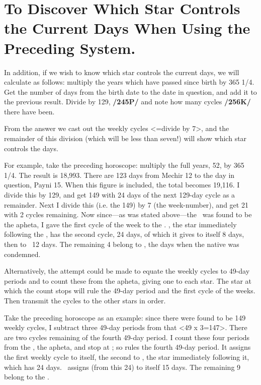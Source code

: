 \section{To Discover Which Star Controls the Current Days When Using the Preceding System.}

In addition, if we wish to know which star controls the current days, we will calculate as follows: multiply the years which have passed since birth by 365 1/4. Get the number of days from the birth date to
the date in question, and add it to the previous result. Divide by 129, \textbf{/245P/} and note how many cycles \textbf{/256K/} there have been. 

From the answer we cast out the weekly cycles <=divide by 7>, and the remainder of this division (which will be less than seven!) will show which star controls the days.

For example, take the preceding horoscope: multiply the full years, 52, by 365 1/4. The result is 18,993. There are 123 days from Mechir 12 to the day in question, Payni 15. When this figure is included, the total becomes 19,116. I divide this by 129, and get 149 with 24 days of the next 129-day cycle as a remainder. Next I divide this (i.e. the 149) by 7 (the week-number), and get 21 with 2 cycles remaining. Now since—as was stated above—the \Moon\, was found to be the apheta, I gave the first cycle of the week to the \Moon. \Venus, the star immediately following the \Moon, has the second cycle, 24 days, of which it gives to itself 8 days, then to \Jupiter\, 12 days. The remaining 4 belong to \Saturn, the days when the native was condemned.

Alternatively, the attempt could be made to equate the weekly cycles to 49-day periods and to count these from the apheta, giving one to each star. The star at which the count stops will rule the 49-day period and the first cycle of the weeks. Then transmit the cycles to the other stars in order. 

Take the preceding horoscope as an example: since there were found to be 149 weekly cycles, I subtract three 49-day periods from that <49 x 3=147>. There are two cycles remaining of the fourth 49-day period. I count these four periods from the \Moon, the apheta, and stop at \Saturn; so \Saturn rules the fourth 49-day period. It assigns the first weekly cycle to itself, the second to \Mars, the star immediately following it, which has 24 days. \Mars\, assigns (from this 24) to itself 15 days. The remaining 9 belong to the \Sun.

